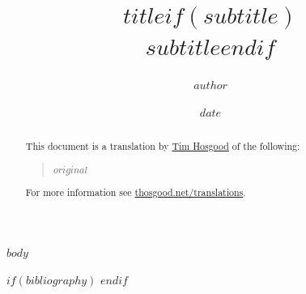 \documentclass[british]{article}
\title{$title$$if(subtitle)$\\\emph{$subtitle$}$endif$}
\author{$author$}
\date{$date$}
\begin{document}
\maketitle
\thispagestyle{fancy}

\setcounter{footnote}{0}

\begin{abstract}
  This document is a translation by \href{https://thosgood.net}{Tim Hosgood} of the following:
  \begin{quote}
    $original$
  \end{quote}
  For more information see \href{https://thosgood.net/translations}{thosgood.net/translations}.
\end{abstract}

\tableofcontents
\bigskip


$body$


$if(bibliography)$
\nocite{*}
\printbibliography[heading=bibintoc,title=Bibliography]
$endif$
\end{document}
